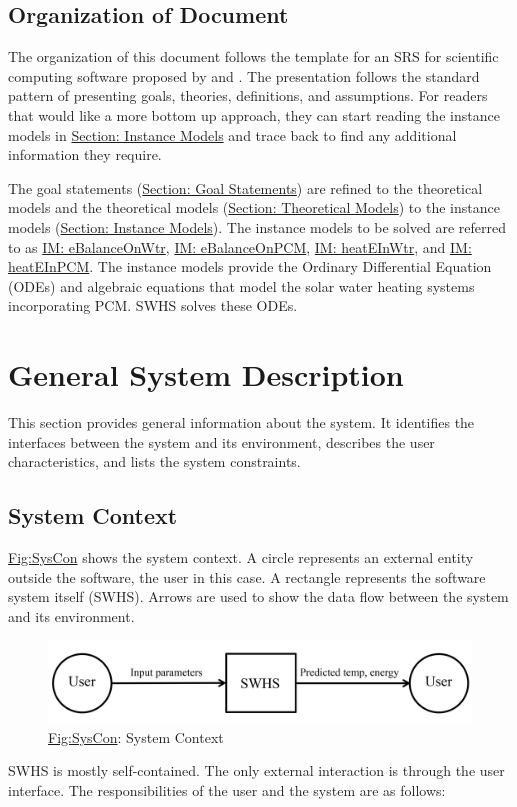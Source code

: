 \documentclass[12pt]{article}
\begin{document}
\subsection{Organization of Document}
\label{Sec:DocOrg}
The organization of this document follows the template for an SRS for scientific computing software proposed by \cite{dParnas1972} and \cite{parnasClements1984}. The presentation follows the standard pattern of presenting goals, theories, definitions, and assumptions. For readers that would like a more bottom up approach, they can start reading the instance models in \hyperref[Sec:IMs]{Section: Instance Models} and trace back to find any additional information they require.

The goal statements (\hyperref[Sec:GoalStmt]{Section: Goal Statements}) are refined to the theoretical models and the theoretical models (\hyperref[Sec:TMs]{Section: Theoretical Models}) to the instance models (\hyperref[Sec:IMs]{Section: Instance Models}). The instance models to be solved are referred to as \hyperref[IM:eBalanceOnWtr]{IM: eBalanceOnWtr}, \hyperref[IM:eBalanceOnPCM]{IM: eBalanceOnPCM}, \hyperref[IM:heatEInWtr]{IM: heatEInWtr}, and \hyperref[IM:heatEInPCM]{IM: heatEInPCM}. The instance models provide the Ordinary Differential Equation (ODEs) and algebraic equations that model the solar water heating systems incorporating PCM. SWHS solves these ODEs.

\section{General System Description}
\label{Sec:GenSysDesc}
This section provides general information about the system. It identifies the interfaces between the system and its environment, describes the user characteristics, and lists the system constraints.

\subsection{System Context}
\label{Sec:SysContext}
\hyperref[Figure:SysCon]{Fig:SysCon} shows the system context. A circle represents an external entity outside the software, the user in this case. A rectangle represents the software system itself (SWHS). Arrows are used to show the data flow between the system and its environment.

\begin{figure}
\begin{center}
\includegraphics[width=\textwidth]{../../../datafiles/SWHS/SystemContextFigure.png}
\caption{\hyperref[Figure:SysCon]{Fig:SysCon}: System Context}
\label{Figure:SysCon}
\end{center}
\end{figure}
SWHS is mostly self-contained. The only external interaction is through the user interface. The responsibilities of the user and the system are as follows:
\end{document}
